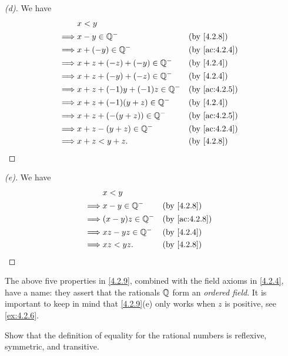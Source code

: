 \begin{proof}[(d)]
  We have
  \begin{align*}
             & x < y                                               \\
    \implies & x - y \in \Q^-                   &  & \by{4.2.8}    \\
    \implies & x + (-y) \in \Q^-                &  & \by{ac:4.2.4} \\
    \implies & x + z + (-z) + (-y) \in \Q^-     &  & \by{4.2.4}    \\
    \implies & x + z + (-y) + (-z) \in \Q^-     &  & \by{4.2.4}    \\
    \implies & x + z + (-1) y + (-1) z \in \Q^- &  & \by{ac:4.2.5} \\
    \implies & x + z + (-1) (y + z) \in \Q^-    &  & \by{4.2.4}    \\
    \implies & x + z + (-(y + z)) \in \Q^-      &  & \by{ac:4.2.5} \\
    \implies & x + z - (y + z) \in \Q^-         &  & \by{ac:4.2.4} \\
    \implies & x + z < y + z.                   &  & \by{4.2.8}
  \end{align*}
\end{proof}

\begin{proof}[(e)]
  We have
  \begin{align*}
             & x < y                                \\
    \implies & x - y \in \Q^-    &  & \by{4.2.8}    \\
    \implies & (x - y)z \in \Q^- &  & \by{ac:4.2.8} \\
    \implies & xz - yz \in \Q^-  &  & \by{4.2.4}    \\
    \implies & xz < yz.          &  & \by{4.2.8}
  \end{align*}
\end{proof}

\begin{rmk}\label{4.2.10}
  The above five properties in \cref{4.2.9}, combined with the field axioms in \cref{4.2.4}, have a name:
  they assert that the rationals \(\mathbb{Q}\) form an \emph{ordered field}.
  It is important to keep in mind that \cref{4.2.9}(e) only works when \(z\) is positive, see \cref{ex:4.2.6}.
\end{rmk}

\exercisesection

\begin{ex}\label{ex:4.2.1}
  Show that the definition of equality for the rational numbers is reflexive, symmetric, and transitive.
\end{ex}

